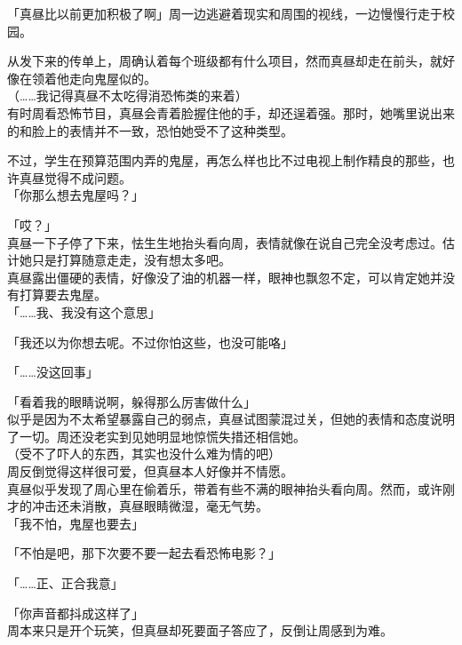 「真昼比以前更加积极了啊」周一边逃避着现实和周围的视线，一边慢慢行走于校园。

从发下来的传单上，周确认着每个班级都有什么项目，然而真昼却走在前头，就好像在领着他走向鬼屋似的。\\

（……我记得真昼不太吃得消恐怖类的来着）\\

有时周看恐怖节目，真昼会青着脸握住他的手，却还逞着强。那时，她嘴里说出来的和脸上的表情并不一致，恐怕她受不了这种类型。

不过，学生在预算范围内弄的鬼屋，再怎么样也比不过电视上制作精良的那些，也许真昼觉得不成问题。\\

「你那么想去鬼屋吗？」

「哎？」\\

真昼一下子停了下来，怯生生地抬头看向周，表情就像在说自己完全没考虑过。估计她只是打算随意走走，没有想太多吧。\\

真昼露出僵硬的表情，好像没了油的机器一样，眼神也飘忽不定，可以肯定她并没有打算要去鬼屋。\\

「……我、我没有这个意思」

「我还以为你想去呢。不过你怕这些，也没可能咯」

「……没这回事」

「看着我的眼睛说啊，躲得那么厉害做什么」\\

似乎是因为不太希望暴露自己的弱点，真昼试图蒙混过关，但她的表情和态度说明了一切。周还没老实到见她明显地惊慌失措还相信她。\\

（受不了吓人的东西，其实也没什么难为情的吧）\\

周反倒觉得这样很可爱，但真昼本人好像并不情愿。\\

真昼似乎发现了周心里在偷着乐，带着有些不满的眼神抬头看向周。然而，或许刚才的冲击还未消散，真昼眼睛微湿，毫无气势。\\

「我不怕，鬼屋也要去」

「不怕是吧，那下次要不要一起去看恐怖电影？」

「……正、正合我意」

「你声音都抖成这样了」\\

周本来只是开个玩笑，但真昼却死要面子答应了，反倒让周感到为难。\\

